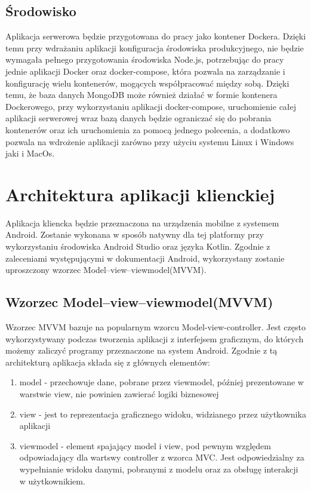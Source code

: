 \documentclass[a4paper,12pt,twoside,openany]{report}
\begin{document}
\subsection{Środowisko}
Aplikacja serwerowa będzie przygotowana do pracy jako kontener Dockera. Dzięki temu przy wdrażaniu aplikacji konfiguracja środowiska produkcyjnego, nie będzie wymagała pełnego przygotowania środowiska Node.js, potrzebując do pracy jednie aplikacji Docker oraz docker-compose, która pozwala na zarządzanie i konfigurację wielu kontenerów, mogących współpracować między sobą. Dzięki temu, że baza danych MongoDB może również działać w formie kontenera Dockerowego, przy wykorzystaniu aplikacji docker-compose, uruchomienie całej aplikacji serwerowej wraz bazą danych będzie ograniczać się do pobrania kontenerów oraz ich uruchomienia za pomocą jednego polecenia, a dodatkowo pozwala na wdrożenie aplikacji zarówno przy użyciu systemu Linux i Windows jaki i MacOs.

\section{Architektura aplikacji klienckiej}
Aplikacja kliencka będzie przeznaczona na urządzenia mobilne z systemem Android. Zostanie wykonana w sposób natywny dla tej platformy przy wykorzystaniu środowiska Android Studio oraz języka Kotlin. Zgodnie z zaleceniami występującymi w dokumentacji Android, wykorzystany zostanie uproszczony wzorzec Model–view–viewmodel(MVVM). 

\subsection{Wzorzec Model–view–viewmodel(MVVM)}
Wzorzec MVVM bazuje na popularnym wzorcu Model-view-controller. Jest często wykorzystywany podczas tworzenia aplikacji z interfejsem graficznym, do których możemy zaliczyć programy przeznaczone na system Android. 
Zgodnie z tą architekturą aplikacja składa się z głównych elementów:
\begin{enumerate}
	\item model - przechowuje dane, pobrane przez viewmodel, później prezentowane w warstwie view, nie powinien zawierać logiki biznesowej
	\item view - jest to reprezentacja graficznego widoku, widzianego przez użytkownika aplikacji
	\item viewmodel - element spajający model i view, pod pewnym względem odpowiadający dla wartswy controller z wzorca MVC. Jest odpowiedzialny za wypełnianie widoku danymi, pobranymi z modelu oraz za obsługę interakcji w użytkownikiem. 
\end{enumerate}
\end{document}
